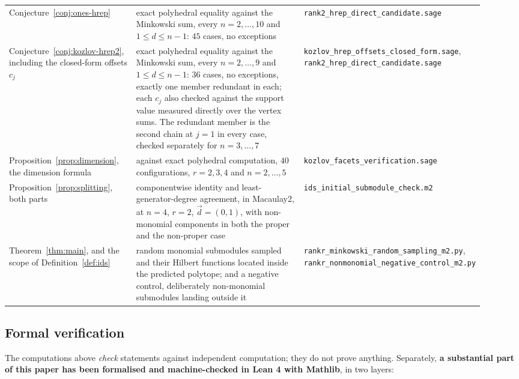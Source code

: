 \documentclass[11pt, a4paper, abstract=yes]{scrartcl}
\theoremstyle{definition}
\theoremstyle{remark}
\theoremstyle{plain}
\begin{document}
\begin{longtable}{@{}p{0.27\linewidth}p{0.38\linewidth}>{\raggedright\arraybackslash}p{0.27\linewidth}@{}}
  \addlinespace
  Conjecture~\ref{conj:ones-hrep}
    & exact polyhedral equality against the Minkowski sum, every $n = 2,\dots,10$ and
      $1 \le d \le n-1$: $45$ cases, no exceptions
    & \texttt{\footnotesize rank2\_\allowbreak hrep\_\allowbreak direct\_\allowbreak candidate.sage} \\
  \addlinespace
  Conjecture~\ref{conj:kozlov-hrep2}, including the closed-form offsets $c_j$
    & exact polyhedral equality against the Minkowski sum, every $n = 2,\dots,9$ and
      $1 \le d \le n-1$: $36$ cases, no exceptions, exactly one member redundant in each; each
      $c_j$ also checked against the support value measured directly over the vertex sums. The
      redundant member is the second chain at $j = 1$ in every case, checked separately for
      $n = 3,\dots,7$
    & \texttt{\footnotesize kozlov\_\allowbreak hrep\_\allowbreak offsets\_\allowbreak closed\_\allowbreak form.sage},
      \texttt{\footnotesize rank2\_\allowbreak hrep\_\allowbreak direct\_\allowbreak candidate.sage} \\
  \addlinespace
  Proposition~\ref{prop:dimension}, the dimension formula
    & against exact polyhedral computation, $40$ configurations, $r = 2,3,4$ and $n = 2,\dots,5$
    & \texttt{\footnotesize kozlov\_\allowbreak facets\_\allowbreak verification.sage} \\
  \addlinespace
  Proposition~\ref{prop:splitting}, both parts
    & componentwise identity and least-generator-degree agreement, in Macaulay2, at $n = 4$,
      $r = 2$, $\vec d = (0,1)$, with non-monomial components in both the proper and the
      non-proper case
    & \texttt{\footnotesize ids\_\allowbreak initial\_\allowbreak submodule\_\allowbreak check.m2} \\
  \addlinespace
  Theorem~\ref{thm:main}, and the scope of Definition~\ref{def:ids}
    & random monomial submodules sampled and their Hilbert functions located inside the predicted
      polytope; and a negative control, deliberately non-monomial submodules landing outside it
    & \texttt{\footnotesize rankr\_\allowbreak minkowski\_\allowbreak random\_\allowbreak sampling\_\allowbreak m2.py},
      \texttt{\footnotesize rankr\_\allowbreak nonmonomial\_\allowbreak negative\_\allowbreak control\_\allowbreak m2.py} \\
  \bottomrule
\end{longtable}
\endgroup
\subsection{Formal verification}
\label{sec-methods-lean}
The computations above \emph{check} statements against independent computation; they do not prove
anything. Separately, \textbf{\textbf{a substantial part of this paper has been formalised and machine-checked in
Lean 4 with Mathlib}}, in two layers:
\end{document}
